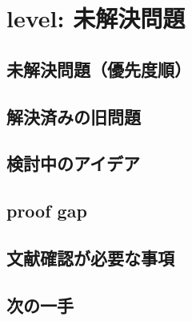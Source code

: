 
\section{level: 未解決問題}

\subsection{未解決問題（優先度順）}

\subsection{解決済みの旧問題}

\subsection{検討中のアイデア}

\subsection{proof gap}

\subsection{文献確認が必要な事項}

\subsection{次の一手}
